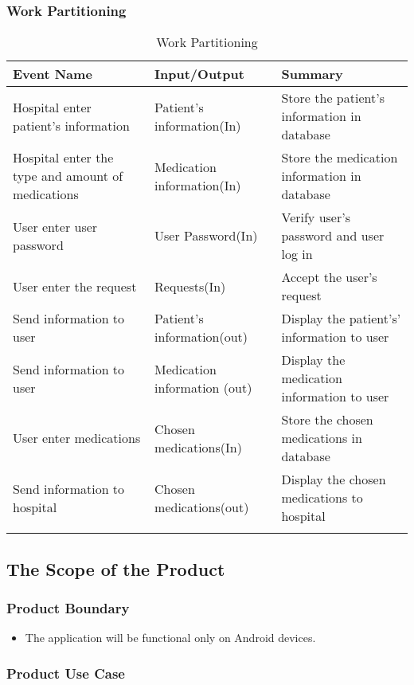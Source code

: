 \documentclass[12pt]{article}
\begin{document}
\subsubsection{Work Partitioning}
\begin{longtable}{|p{5cm}|p{5cm}|p{5cm}|}
\hline
Event Name & Input/Output & Summary \\
\hline
Hospital enter patient’s information  & Patient’s information(In) & Store the patient’s information in database \\
\hline
Hospital enter the type and amount of medications & Medication information(In) & Store the medication information in database \\
\hline
User enter user password & User Password(In) & Verify user’s password and user log in \\
\hline
User enter the request & Requests(In) & Accept the user’s request \\
\hline
Send information to user & Patient’s information(out) & Display the patient's’ information to user \\
\hline
Send information to user & Medication information (out) & Display the medication information to user \\
\hline
User enter medications & Chosen medications(In) & Store the chosen medications in database \\
\hline
Send information to hospital  & Chosen medications(out) & Display the chosen medications to hospital \\

\caption{Work Partitioning}
\label{tab:workpartition}
\end{longtable}

\subsection{The Scope of the Product}
\subsubsection{Product Boundary}
\begin{itemize}
\item The application will be functional only on Android devices.
\end{itemize}

\subsubsection{Product Use Case}
 
\end{document}
